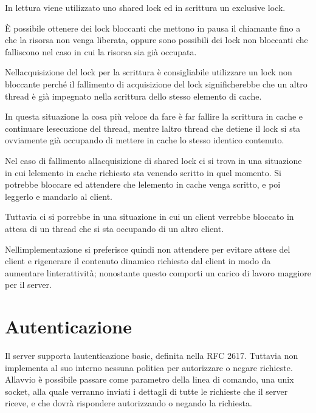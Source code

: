 \documentclass[a4paper,11pt]{article}
\begin{document}
{\sffamily
In lettura viene utilizzato uno shared lock ed in scrittura un exclusive
lock.}


\bigskip

{\sffamily
\`E possibile ottenere dei lock bloccanti che mettono in pausa il
chiamante fino a che la risorsa non venga liberata, oppure sono
possibili dei lock non bloccanti che falliscono nel caso in cui la
risorsa sia gi\`a occupata.}


\bigskip

{\sffamily
Nell{\textquotesingle}acquisizione del lock per la scrittura \`e
consigliabile utilizzare un lock non bloccante perch\'e il fallimento
di acquisizione del lock significherebbe che un altro thread \`e gi\`a
impegnato nella scrittura dello stesso elemento di cache.}

{\sffamily
In questa situazione la cosa pi\`u veloce da fare \`e far fallire la
scrittura in cache e continuare l{\textquotesingle}esecuzione del
thread, mentre l{\textquotesingle}altro thread che detiene il lock si
sta ovviamente gi\`a occupando di mettere in cache lo stesso identico
contenuto.}


\bigskip

{\sffamily
Nel caso di fallimento all{\textquotesingle}acquisizione di shared lock
ci si trova in una situazione in cui l{\textquotesingle}elemento in
cache richiesto sta venendo scritto in quel momento. Si potrebbe
bloccare ed attendere che l{\textquotesingle}elemento in cache venga
scritto, e poi leggerlo e mandarlo al client.}

{\sffamily
Tuttavia ci si porrebbe in una situazione in cui un client verrebbe
bloccato in attesa di un thread che si sta occupando di un altro
client.}

{\sffamily
Nell{\textquotesingle}implementazione si preferisce quindi non attendere
per evitare attese del client e rigenerare il contenuto dinamico
richiesto dal client in modo da aumentare
l{\textquotesingle}interattivit\`a; nonostante questo comporti un
carico di lavoro maggiore per il server.}


\bigskip

\section{Autenticazione}
{\sffamily
Il server supporta l{\textquotesingle}autenticazione basic, definita
nella RFC 2617. Tuttavia non implementa al suo interno nessuna politica
per autorizzare o negare richieste. All{\textquotesingle}avvio \`e
possibile passare come parametro della linea di comando, una unix
socket, alla quale verranno inviati i dettagli di tutte le richieste
che il server riceve, e che dovr\`a rispondere autorizzando o negando
la richiesta.}
\end{document}

